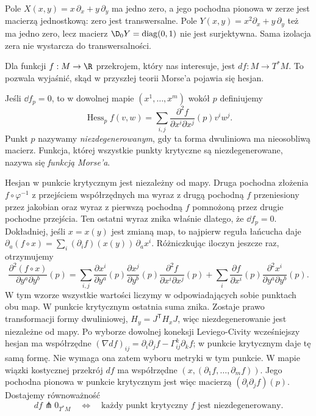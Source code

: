 \begin{przyklad}
Pole $X(x,y)=x\,\partial_x+y\,\partial_y$ ma
jedno zero, a jego pochodna pionowa w zerze
jest macierzą jednostkową: zero jest
transwersalne. Pole
$Y(x,y)=x^2\partial_x+y\,\partial_y$
też ma jedno zero, lecz macierz
$\D_0Y=\operatorname{diag}(0,1)$
nie jest surjektywna. Sama izolacja zera
nie wystarcza do transwersalności.
\end{przyklad}

Dla funkcji $f:M\to\R$ przekrojem, który
nas interesuje, jest $df:M\to T^*M$.
To pozwala wyjaśnić, skąd w przyszłej
teorii Morse'a pojawia się hesjan.

\begin{definicja}
\label{def:morse-pochodna}
Jeśli $\dd f_p=0$, to w dowolnej mapie
$(x^1,\ldots,x^m)$ wokół $p$ definiujemy
\[
 \operatorname{Hess}_p f(v,w)
 =\sum_{i,j}
    \frac{\partial^2 f}{\partial x^i\partial x^j}(p)
                   v^iw^j.
\]
Punkt $p$ nazywamy \emph{niezdegenerowanym},
gdy ta forma dwuliniowa ma nieosobliwą macierz.
Funkcja, której wszystkie punkty krytyczne
są niezdegenerowane, nazywa się
\emph{funkcją Morse'a}.
\end{definicja}

Hesjan w punkcie krytycznym jest niezależny
od mapy. Druga pochodna złożenia
$f\circ\varphi^{-1}$ z przejściem współrzędnych
ma wyraz z drugą pochodną $f$ przeniesiony
przez jakobian oraz wyraz z pierwszą pochodną
$f$ pomnożoną przez drugie pochodne przejścia.
Ten ostatni wyraz znika właśnie dlatego,
że $\dd f_p=0$. Dokładniej, jeśli $x=x(y)$ jest zmianą map,
to najpierw reguła łańcucha daje
$\partial_a(f\circ x)=\sum_i(\partial_if)(x(y))\,\partial_ax^i$.
Różniczkując iloczyn jeszcze raz, otrzymujemy
\[
 \frac{\partial^2(f\circ x)}{\partial y^a\partial y^b}(p)
 =\sum_{i,j}\frac{\partial x^i}{\partial y^a}(p)
             \frac{\partial x^j}{\partial y^b}(p)
             \frac{\partial^2 f}{\partial x^i\partial x^j}(p)
  +\sum_i\frac{\partial f}{\partial x^i}(p)
             \frac{\partial^2x^i}{\partial y^a\partial y^b}(p).
\]
W tym wzorze wszystkie wartości liczymy w odpowiadających
sobie punktach obu map. W punkcie krytycznym ostatnia suma
znika. Zostaje prawo transformacji formy dwuliniowej,
$H_y=J^{\mathsf T}H_xJ$, więc niezdegenerowanie jest
niezależne od mapy. Po wyborze dowolnej koneksji
Leviego-Civity wcześniejszy hesjan ma współrzędne
$(\nabla df)_{ij}=\partial_i\partial_jf-\Gamma^k_{ij}\partial_kf$;
w punkcie krytycznym daje tę samą formę. Nie wymaga
ona zatem wyboru metryki w tym punkcie.
W mapie wiązki kostycznej
przekrój $df$ ma współrzędne
$(x,(\partial_1f,\ldots,\partial_m f))$.
Jego pochodna pionowa w punkcie krytycznym
jest więc macierzą
$(\partial_i\partial_j f)(p)$. Dostajemy
równoważność
\begin{equation}\label{eq:morse-transwersalnosc}
 df\pitchfork 0_{T^*M}
 \quad\Longleftrightarrow\quad
 \text{każdy punkt krytyczny $f$ jest
 niezdegenerowany.}
\end{equation}

